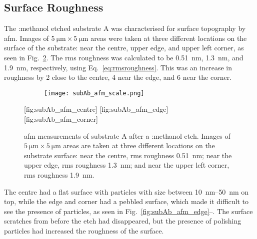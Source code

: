 \subsection{Surface Roughness}

The :methanol etched substrate A was characterised for surface topography by \ac{afm}. Images of $\SI{5}{\micro\metre}\times\SI{5}{\micro\metre}$ areas were taken at three different locations on the surface of the substrate: near the centre, upper edge, and upper left corner, as seen in Fig.~\ref{fig:subAb_afm}. The \ac{rms} roughness was calculated to be \SI{0.51}{\nano\metre}, \SI{1.3}{\nano\metre}, and \SI{1.9}{\nano\metre}, respectively, using Eq.~\ref{eq:rmsroughness}. This was an increase in roughness by 2 close to the centre, 4 near the edge, and 6 near the corner. 

\begin{figure}[htbp]
    \centering
    \begin{subfigure}[c]{0.032\linewidth}
        \label{fig:subAb_afm_scale}\captionsetup{list=no}
        \texttt{[image: subAb\_afm\_scale.png]}
    \end{subfigure}
    \hfill
    [fig:subAb_afm_centre] %
    \hfill
    [fig:subAb_afm_edge] %
    \hfill
    [fig:subAb_afm_corner]%
    \caption[\Ac{afm} of substrate A after a :methanol etch.]{\Ac{afm} measurements of substrate A after a :methanol etch. Images of $\SI{5}{\micro\metre}\times\SI{5}{\micro\metre}$ areas are taken at three different locations on the substrate surface:  near the centre, \ac{rms} roughness \SI{0.51}{\nano\metre};  near the upper edge, \ac{rms} roughness \SI{1.3}{\nano\metre}; and  near the upper left corner, \ac{rms} roughness \SI{1.9}{\nano\metre}.}\label{fig:subAb_afm}
\end{figure} %

The centre had a flat surface with particles with size between \SIrange{10}{50}{\nano\metre} on top, while the edge and corner had a pebbled surface, which made it difficult to see the presence of particles, as seen in Fig.~\ref{fig:subAb_afm_edge}--. The surface scratches from before the etch had disappeared, but the presence of polishing particles had increased the roughness of the surface.

